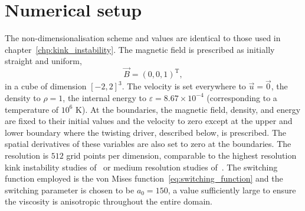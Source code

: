 \section{Numerical setup}

The non-dimensionalisation scheme and values are identical to those used in chapter~\ref{chp:kink_instability}. The magnetic field is prescribed as initially straight and uniform,
\begin{equation}
\vec{B} = (0, 0, 1)^{\text{T}},
\end{equation}
in a cube of dimension $[-2,2]^3$. The velocity is set everywhere to $\vec{u} = \vec{0}$, the density to $\rho = 1$, the internal energy to $\varepsilon = 8.67\times 10^{-4}$ (corresponding to a temperature of $10^6$ K). At the boundaries, the magnetic field, density, and energy are fixed to their initial values and the velocity to zero except at the upper and lower boundary where the twisting driver, described below, is prescribed. The spatial derivatives of these variables are also set to zero at the boundaries. The resolution is $512$ grid points per dimension, comparable to the highest resolution kink instability studies of~\cite{hoodCoronalHeatingMagnetic2009} or medium resolution studies of~\cite{barefordShockHeatingNumerical2015}. The switching function employed is the von Mises function~\eqref{eq:switching_function} and the switching parameter is chosen to be $a_0 = 150$, a value sufficiently large to ensure the viscosity is anisotropic throughout the entire domain. 

